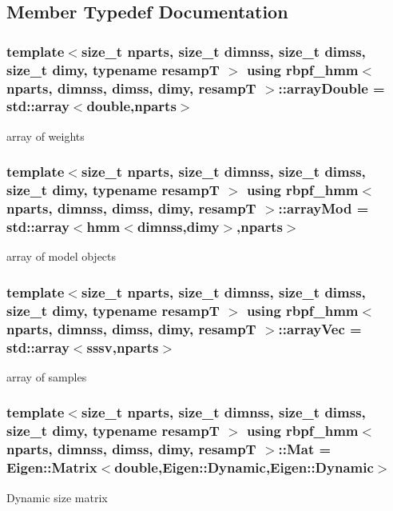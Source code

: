 \subsection{Member Typedef Documentation}
\subsubsection[{\texorpdfstring{array\+Double}{arrayDouble}}]{\setlength{\rightskip}{0pt plus 5cm}template$<$size\+\_\+t nparts, size\+\_\+t dimnss, size\+\_\+t dimss, size\+\_\+t dimy, typename resampT $>$ using {\bf rbpf\+\_\+hmm}$<$ nparts, dimnss, dimss, dimy, resampT $>$\+::{\bf array\+Double} =  std\+::array$<$double,nparts$>$}\hypertarget{classrbpf__hmm_a678ef06587101ea51bbb5709f08644bd}{}\label{classrbpf__hmm_a678ef06587101ea51bbb5709f08644bd}
array of weights 
\subsubsection[{\texorpdfstring{array\+Mod}{arrayMod}}]{\setlength{\rightskip}{0pt plus 5cm}template$<$size\+\_\+t nparts, size\+\_\+t dimnss, size\+\_\+t dimss, size\+\_\+t dimy, typename resampT $>$ using {\bf rbpf\+\_\+hmm}$<$ nparts, dimnss, dimss, dimy, resampT $>$\+::{\bf array\+Mod} =  std\+::array$<${\bf hmm}$<$dimnss,dimy$>$,nparts$>$}\hypertarget{classrbpf__hmm_a7a98fa51630fb04d09c3bd73e3e82ba8}{}\label{classrbpf__hmm_a7a98fa51630fb04d09c3bd73e3e82ba8}
array of model objects 
\subsubsection[{\texorpdfstring{array\+Vec}{arrayVec}}]{\setlength{\rightskip}{0pt plus 5cm}template$<$size\+\_\+t nparts, size\+\_\+t dimnss, size\+\_\+t dimss, size\+\_\+t dimy, typename resampT $>$ using {\bf rbpf\+\_\+hmm}$<$ nparts, dimnss, dimss, dimy, resampT $>$\+::{\bf array\+Vec} =  std\+::array$<${\bf sssv},nparts$>$}\hypertarget{classrbpf__hmm_a9d9a1df8406fa41b2422291768d9c2f4}{}\label{classrbpf__hmm_a9d9a1df8406fa41b2422291768d9c2f4}
array of samples 
\subsubsection[{\texorpdfstring{Mat}{Mat}}]{\setlength{\rightskip}{0pt plus 5cm}template$<$size\+\_\+t nparts, size\+\_\+t dimnss, size\+\_\+t dimss, size\+\_\+t dimy, typename resampT $>$ using {\bf rbpf\+\_\+hmm}$<$ nparts, dimnss, dimss, dimy, resampT $>$\+::{\bf Mat} =  Eigen\+::\+Matrix$<$double,Eigen\+::\+Dynamic,Eigen\+::\+Dynamic$>$}\hypertarget{classrbpf__hmm_a5977cfebfd8736d3a54390f5a21d40b2}{}\label{classrbpf__hmm_a5977cfebfd8736d3a54390f5a21d40b2}
Dynamic size matrix 
